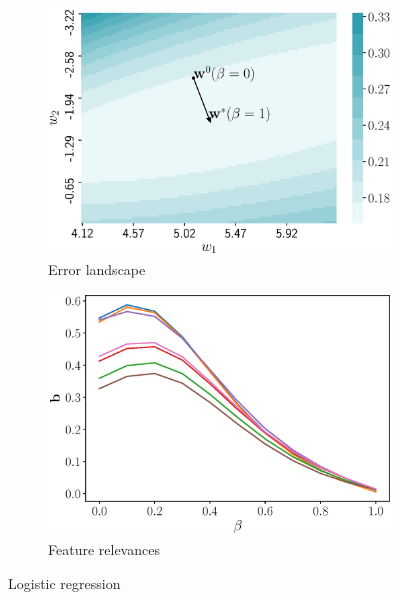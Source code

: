 \documentclass[a4paper,12pt]{article}
\theoremstyle{plain} %
\theoremstyle{definition} %
\theoremstyle{remark} %
\begin{document}
  		\begin{figure}[!h]
  			\centering
  			\begin{subfigure}{.5\textwidth}
  				\centering
  				\includegraphics[width=\linewidth]{figs/log_reg_error}
  				\caption{Error landscape}
  				\label{fig:log_reg_error}
  			\end{subfigure}%
  			\begin{subfigure}{.5\textwidth}
  				\centering
  				\includegraphics[width=\linewidth]{figs/log_reg_b_wrt_beta.eps}
  				\caption{Feature relevances}
  				\label{fig:log_reg_b_wrt_beta}
  			\end{subfigure}
  			\caption{Logistic regression}
  			\label{fig:}
  		\end{figure}
  	
\end{document}
